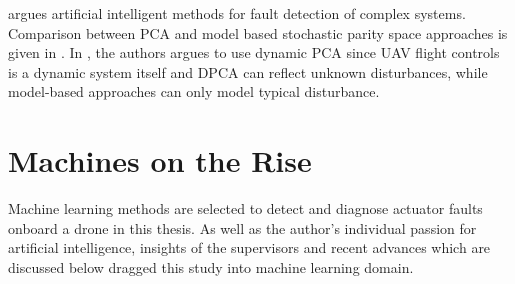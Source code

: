 \cite{gui2002fault} argues artificial intelligent methods for fault detection of complex 
systems. Comparison between PCA and model based stochastic parity space 
approaches is given in \cite{hagenblad2004comparison}.
In \cite{li2016data}, the authors argues to use dynamic PCA since UAV flight 
controls is a dynamic system itself and DPCA can reflect unknown disturbances, 
while model-based approaches can only model typical disturbance.  

\section{Machines on the Rise}

Machine learning methods are selected to detect and diagnose actuator faults onboard a drone in this thesis. 
As well as the author's individual passion for artificial intelligence, insights of the supervisors and recent advances which are discussed below dragged this study into machine learning domain.

